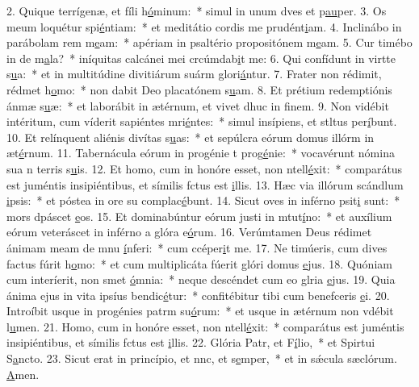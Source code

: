 2. Quique terrígenæ, et fíli h\uline{ó}minum:~* simul in unum dves et p\uline{au}per.
3. Os meum loquétur spi\uline{é}ntiam:~* et meditátio cordis me prudént\uline{i}am.
4. Inclinábo in parábolam rem m\uline{e}am:~* apériam in psaltério propositónem m\uline{e}am.
5. Cur timébo in de m\uline{a}la?~* iníquitas calcánei mei crcúmdab\uline{i}t me:
6. Qui confídunt in virtte s\uline{u}a:~* et in multitúdine divitiárum suárm glori\uline{á}ntur.
7. Frater non rédimit, rédmet h\uline{o}mo:~* non dabit Deo placatónem s\uline{u}am.
8. Et prétium redemptiónis ánmæ s\uline{u}æ:~* et laborábit in ætérnum, et vivet dhuc in f\uline{i}nem.
9. Non vidébit intéritum, cum víderit sapiéntes mri\uline{é}ntes:~* simul insípiens, et stltus per\uline{í}bunt.
10. Et relínquent aliénis divítas s\uline{u}as:~* et sepúlcra eórum domus illórm in æt\uline{é}rnum.
11. Tabernácula eórum in progénie t prog\uline{é}nie:~* vocavérunt nómina sua n terris s\uline{u}is.
12. Et homo, cum in honóre esset, non ntell\uline{é}xit:~* comparátus est juméntis insipiéntibus, et símilis fctus est \uline{i}llis.
13. Hæc via illórum scándlum \uline{i}psis:~* et póstea in ore su complac\uline{é}bunt.
14. Sicut oves in inférno psit\uline{i} sunt:~* mors dpáscet \uline{e}os.
15. Et dominabúntur eórum justi in mtut\uline{í}no:~* et auxílium eórum veteráscet in inférno a glóra e\uline{ó}rum.
16. Verúmtamen Deus rédimet ánimam meam de mnu \uline{í}nferi:~* cum ccéper\uline{i}t me.
17. Ne timúeris, cum dives factus fúrit h\uline{o}mo:~* et cum multiplicáta fúerit glóri domus \uline{e}jus.
18. Quóniam cum interíerit, non smet \uline{ó}mnia:~* neque descéndet cum eo glria \uline{e}jus.
19. Quia ánima ejus in vita ipsíus bendic\uline{é}tur:~* confitébitur tibi cum benefceris \uline{e}i.
20. Introíbit usque in progénies patrm su\uline{ó}rum:~* et usque in ætérnum non vdébit l\uline{u}men.
21. Homo, cum in honóre esset, non ntell\uline{é}xit:~* comparátus est juméntis insipiéntibus, et símilis fctus est \uline{i}llis.
22. Glória Patr, et F\uline{í}lio,~* et Spirtui S\uline{a}ncto.
23. Sicut erat in princípio, et nnc, et s\uline{e}mper,~* et in sǽcula sæclórum. \uline{A}men.
